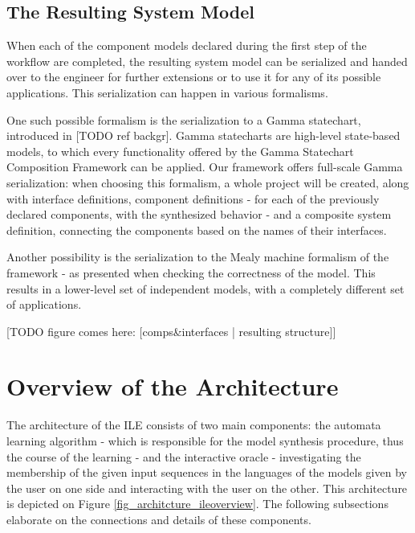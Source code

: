 \subsection{The Resulting System Model} \label{subs_resultingmodel}
When each of the component models declared during the first step of the workflow are completed, the resulting system model can be serialized and handed over to the engineer for further extensions or to use it for any of its possible applications. This serialization can happen in various formalisms.

One such possible formalism is the serialization to a Gamma statechart, introduced in [TODO ref backgr]. Gamma statecharts are high-level state-based models, to which every functionality offered by the Gamma Statechart Composition Framework can be applied. Our framework offers full-scale Gamma serialization: when choosing this formalism, a whole project will be created, along with interface definitions, component definitions - for each of the previously declared components, with the synthesized behavior - and a composite system definition, connecting the components based on the names of their interfaces.

Another possibility is the serialization to the Mealy machine formalism of the framework - as presented when checking the correctness of the model. This results in a lower-level set of independent models, with a completely different set of applications.

[TODO figure comes here: [comps\&interfaces | resulting structure]]
\clearpage
\section{Overview of the Architecture} \label{sec_architecture}

The architecture of the ILE consists of two main components: the automata learning algorithm - which is responsible for the model synthesis procedure, thus the course of the learning - and the interactive oracle - investigating the membership of the given input sequences in the languages of the models given by the user on one side and interacting with the user on the other. This architecture is depicted on Figure \ref{fig_architcture_ileoverview}. The following subsections elaborate on the connections and details of these components. %

